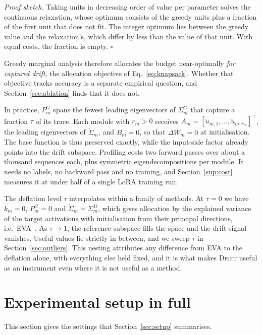 \documentclass[conference,onecolumn]{IEEEtran}
\newcommand{\method}{\textsc{Drift}}
\begin{document}
\noindent\emph{Proof sketch.} Taking units in decreasing order of value per
parameter solves the continuous relaxation, whose optimum consists of the greedy
units plus a fraction of the first unit that does not fit. The integer optimum
lies between the greedy value and the relaxation's, which differ by less than the
value of that unit. With equal costs, the fraction is empty. \hfill$\square$

\smallskip
Greedy marginal analysis therefore allocates the budget near-optimally
\emph{for captured drift}, the allocation objective of
Eq.~\eqref{eq:knapsack}. Whether that objective tracks accuracy is a separate
empirical question, and Section~\ref{sec:ablation} finds that it does not.

In practice, $P^{G}_m$ spans the fewest leading eigenvectors of $\Sigma^{G}_m$
that capture a fraction $\tau$ of its trace. Each module with
$r_m > 0$ receives
$A_m = [\widetilde{u}_{m,1},\dots,\widetilde{u}_{m,r_m}]^{\top}$, the leading
eigenvectors of $\widetilde{\Sigma}_m$, and $B_m = 0$, so that $\Delta W_m = 0$
at initialisation. The base function is thus preserved exactly, while the
input-side factor already points into the drift subspace. Profiling costs two
forward passes over about a thousand sequences each, plus symmetric
eigendecompositions per module. It needs no labels, no backward pass and no
training, and Section~\ref{sup:cost} measures it at under half of a single LoRA
training run.

The deflation level $\tau$ interpolates within a family of methods. At
$\tau = 0$ we have $k_m = 0$, $P^{G}_m = 0$ and
$\widetilde{\Sigma}_m = \Sigma^{D}_m$, which gives allocation by the explained
variance of the target activations with initialisation from their principal
directions, i.e.\ EVA~\cite{paischer2025eva}. As $\tau \to 1$, the reference
subspace fills the space and the drift signal vanishes. Useful values lie
strictly in between, and we sweep $\tau$ in Section~\ref{sec:outliers}. This
nesting attributes any difference from EVA to the deflation alone, with
everything else held fixed, and it is what makes \method{} useful as an
instrument even where it is not useful as a method.

\section{Experimental setup in full}
\label{sup:setup}
This section gives the settings that Section~\ref{sec:setup} summarises.
\end{document}
